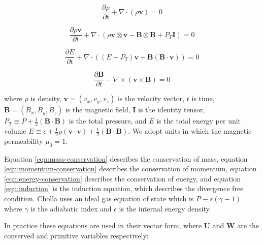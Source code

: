 \documentclass[modern, linenumbers]{aastex631}
\begin{document}
\begin{equation}
    \label{eqn:mass-conservation}
    \frac{\partial \rho}{\partial t} + \nabla \cdot (\rho \boldsymbol{v}) = 0
\end{equation}

\begin{equation}
    \label{eqn:momentum-conservation}
    \frac{\partial \rho\boldsymbol{v}}{\partial t} + \nabla \cdot (\rho \boldsymbol{v}\otimes\boldsymbol{v} - \boldsymbol{B}\otimes\boldsymbol{B} + P_T\boldsymbol{I}) = 0
\end{equation}

\begin{equation}
    \label{eqn:energy-conservation}
    \frac{\partial E}{\partial t} + \nabla \cdot ( (E + P_T) \boldsymbol{v} + \boldsymbol{B}(\boldsymbol{B}\cdot\boldsymbol{v}) ) = 0
\end{equation}

\begin{equation}
    \label{eqn:induction}
    \frac{\partial \boldsymbol{B}}{\partial t} - \nabla \times (\boldsymbol{v} \times \boldsymbol{B}) = 0
\end{equation}

\noindent where $\rho$ is density, $\boldsymbol{v} = ( v_x, v_y, v_z)$ is the velocity vector, $t$ is time, $\boldsymbol{B} = ( B_x, B_y, B_z)$ is the magnetic field, $\boldsymbol{I}$ is the identity tensor, $P_T \equiv P + \frac{1}{2}(\boldsymbol{B} \cdot \boldsymbol{B})$ is the total pressure, and $E$ is the total energy per unit volume $E \equiv \epsilon + \frac{1}{2}\rho(\boldsymbol{v}\cdot\boldsymbol{v}) + \frac{1}{2}(\boldsymbol{B}\cdot\boldsymbol{B})$. We adopt units in which the magnetic permeability $\mu_0 = 1$.

Equation \ref{eqn:mass-conservation} describes the conservation of mass, equation \ref{eqn:momentum-conservation} describes the conservation of momentum, equation \ref{eqn:energy-conservation} describes the conservation of energy, and equation \ref{eqn:induction} is the induction equation, which describes the divergence free condition. Cholla uses an ideal gas equation of state  which is $P \equiv \epsilon(\gamma - 1)$ where $\gamma$ is the adiabatic index and $\epsilon$ is the internal energy density.

In practice these equations are used in their vector form, where $\boldsymbol{U}$ and $\boldsymbol{W}$ are the conserved and primitive variables respectively:
\end{document}
